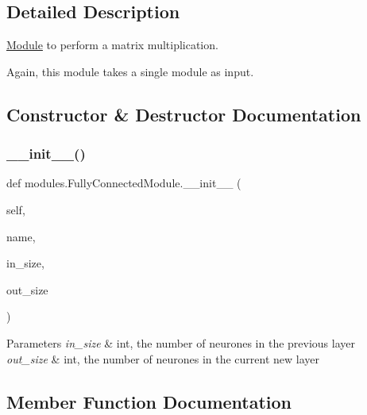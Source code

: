 \subsection{Detailed Description}
\hyperlink{classmodules_1_1_module}{Module} to perform a matrix multiplication. 

Again, this module takes a single module as input. 

\subsection{Constructor \& Destructor Documentation}
\mbox{\label{classmodules_1_1_fully_connected_module_afb394d5c031fef0fec0feeec80a54fae}} 
\subsubsection{\texorpdfstring{\+\_\+\+\_\+init\+\_\+\+\_\+()}{\_\_init\_\_()}}
{\footnotesize\ttfamily def modules.\+Fully\+Connected\+Module.\+\_\+\+\_\+init\+\_\+\+\_\+ (\begin{DoxyParamCaption}\item[{}]{self,  }\item[{}]{name,  }\item[{}]{in\+\_\+size,  }\item[{}]{out\+\_\+size }\end{DoxyParamCaption})}


\begin{DoxyParams}{Parameters}
{\em in\+\_\+size} & int, the number of neurones in the previous layer \\
\hline
{\em out\+\_\+size} & int, the number of neurones in the current new layer \\
\hline
\end{DoxyParams}


\subsection{Member Function Documentation}
\mbox{\label{classmodules_1_1_fully_connected_module_adb0bf41ff737487804b75ee8bdd9a3b4}} 
